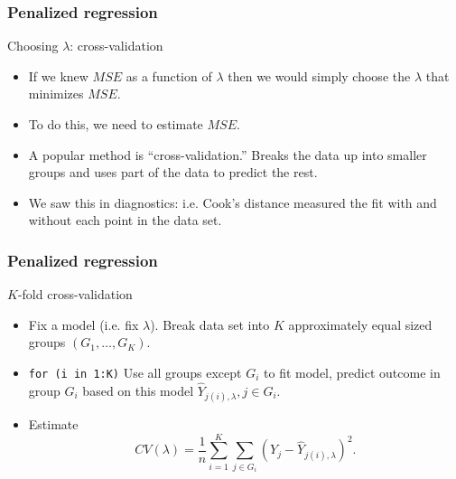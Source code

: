 \documentclass[handout]{beamer}
\begin{document}

   \begin{frame} \frametitle{Penalized regression}

   \begin{block}
   {Choosing $\lambda$: cross-validation  }
       \begin{itemize}

       \item If we knew $MSE$ as a function of $\lambda$ then we would simply choose the $\lambda$ that minimizes $MSE$.

       \item To do this, we need to estimate $MSE$.

       \item A popular method is ``cross-validation.'' Breaks the data up into smaller groups and uses part of the data to predict the rest.

       \item We saw this in diagnostics: i.e.  Cook's distance measured the fit with and without each point in the data set.
       \end{itemize}

   \end{block}
   \end{frame}


   \begin{frame} \frametitle{Penalized regression}

   \begin{block}
   {$K$-fold cross-validation                     }
       \begin{itemize}

       \item Fix a model (i.e. fix $\lambda$). Break data set into $K$ approximately equal sized groups $(G_1, \dots, G_K)$.

       \item {\tt for (i in 1:K)} Use all groups except $G_i$ to fit model, predict  outcome in group $G_i$ based on this model $\widehat{Y}_{j(i),\lambda}, j \in G_i$.

       \item Estimate
   $$
   CV(\lambda) = \frac{1}{n}\sum_{i=1}^K \sum_{j \in G_i} (Y_j - \widehat{Y}_{j(i),\lambda})^2.$$
       \end{itemize}

   \end{block}
   \end{frame}
\end{document}
